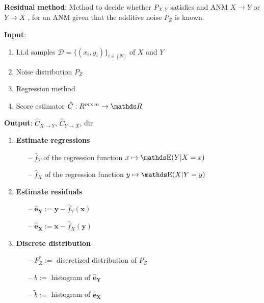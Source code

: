 \begin{algorithm}[H]

    \caption{\textbf{Residual method}: Method to decide whether $P_{X, Y}$ satisfies and ANM $X \rightarrow Y$
        or $Y \rightarrow X$ , for an ANM given that the additive noise $P_Z$ is known.}
  
    \textbf{Input}:

    \begin{enumerate}
        \item I.i.d samples $\mathcal{D} = \{ (x_i, y_i )\}_{i \in [N]}$ of $X$ and $Y$
        \item Noise distribution $P_Z$
        \item Regression method
        \item Score estimator $\hat{C}: R^{m \times m} \rightarrow \R$
    \end{enumerate}
    
    \textbf{Output}: $\hat{C}_{X \rightarrow Y}$, $\hat{C}_{Y \rightarrow X}$, dir

    \begin{enumerate}

        \item \textbf{Estimate regressions} 
        
        \begin{itemize}
            \item[--] $\hat{f}_Y$ of the regression function $x \mapsto \E(Y | X=x)$
            \item[--] $\hat{f}_X$ of the regression function $y \mapsto \E(X | Y=y)$
        \end{itemize}

        \item \textbf{Estimate residuals} 
        
        \begin{itemize}
            \item[--] $ \mathbf{\hat{e}_{Y}} := \mathbf{y} - \hat{f}_Y(\mathbf{x})$
            \item[--] $ \mathbf{\hat{e}_{X}} := \mathbf{x} - \hat{f}_X(\mathbf{y})$
        \end{itemize}


        \item \textbf{Discrete distribution} 
       
        \begin{itemize}
            \item[--] $P^*_Z :=$ discretized distribution of $P_Z$
            \item[--] $b :=$ histogram of $ \mathbf{\hat{e}_{Y}}$
            \item[--] $\tilde{b} :=$ histogram of $ \mathbf{\hat{e}_{X}}$
        \end{itemize}


\end{enumerate}
\end{algorithm}
